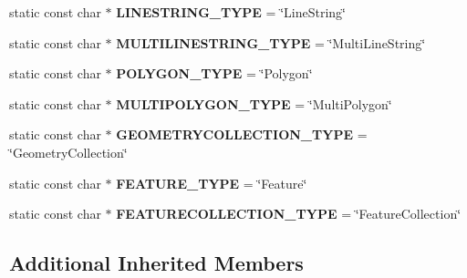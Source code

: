 \begin{DoxyCompactItemize}
\item 
\mbox{\label{classItem__func__geomfromgeojson_a2068b26fd4745be319513963a862631e}} 
static const char $\ast$ {\bfseries L\+I\+N\+E\+S\+T\+R\+I\+N\+G\+\_\+\+T\+Y\+PE} = \char`\"{}Line\+String\char`\"{}
\item 
\mbox{\label{classItem__func__geomfromgeojson_afce07225f48ddbaa880e194b7ba43d56}} 
static const char $\ast$ {\bfseries M\+U\+L\+T\+I\+L\+I\+N\+E\+S\+T\+R\+I\+N\+G\+\_\+\+T\+Y\+PE} = \char`\"{}Multi\+Line\+String\char`\"{}
\item 
\mbox{\label{classItem__func__geomfromgeojson_af8c3410655da49ad2d83768bde7cb759}} 
static const char $\ast$ {\bfseries P\+O\+L\+Y\+G\+O\+N\+\_\+\+T\+Y\+PE} = \char`\"{}Polygon\char`\"{}
\item 
\mbox{\label{classItem__func__geomfromgeojson_a499820a6c4207f48d8ec0151dcdc4a81}} 
static const char $\ast$ {\bfseries M\+U\+L\+T\+I\+P\+O\+L\+Y\+G\+O\+N\+\_\+\+T\+Y\+PE} = \char`\"{}Multi\+Polygon\char`\"{}
\item 
\mbox{\label{classItem__func__geomfromgeojson_af32a2c136c92da0405c965f6b3e92009}} 
static const char $\ast$ {\bfseries G\+E\+O\+M\+E\+T\+R\+Y\+C\+O\+L\+L\+E\+C\+T\+I\+O\+N\+\_\+\+T\+Y\+PE} = \char`\"{}Geometry\+Collection\char`\"{}
\item 
\mbox{\label{classItem__func__geomfromgeojson_a663ecfd3d219b05eaa3265709deb0e1e}} 
static const char $\ast$ {\bfseries F\+E\+A\+T\+U\+R\+E\+\_\+\+T\+Y\+PE} = \char`\"{}Feature\char`\"{}
\item 
\mbox{\label{classItem__func__geomfromgeojson_a0edfe6a7f44f26d04de719564db4c11a}} 
static const char $\ast$ {\bfseries F\+E\+A\+T\+U\+R\+E\+C\+O\+L\+L\+E\+C\+T\+I\+O\+N\+\_\+\+T\+Y\+PE} = \char`\"{}Feature\+Collection\char`\"{}
\end{DoxyCompactItemize}
\subsection*{Additional Inherited Members}



